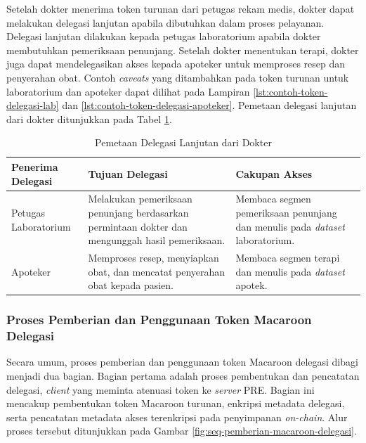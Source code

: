 \documentclass[bahasa, 12pt, a4paper, onecolumn, oneside, final]{report}
\begin{document}
Setelah dokter menerima token turunan dari petugas rekam medis, dokter dapat melakukan delegasi lanjutan apabila dibutuhkan dalam proses pelayanan. Delegasi lanjutan dilakukan kepada petugas laboratorium apabila dokter membutuhkan pemeriksaan penunjang. Setelah dokter menentukan terapi, dokter juga dapat mendelegasikan akses kepada apoteker untuk memproses resep dan penyerahan obat.  Contoh \textit{caveats} yang ditambahkan pada token turunan untuk laboratorium dan apoteker dapat dilihat pada Lampiran \ref{lst:contoh-token-delegasi-lab} dan \ref{lst:contoh-token-delegasi-apoteker}. Pemetaan delegasi lanjutan dari dokter ditunjukkan pada Tabel \ref{tab:pemetaan-delegasi-dokter-lanjutan}.

\begin{table}[!ht]
	\centering
	\caption{Pemetaan Delegasi Lanjutan dari Dokter}
	\label{tab:pemetaan-delegasi-dokter-lanjutan}
	\small
	\begin{tabular}{|p{}|p{}|p{}|}
		\hline
		\textbf{Penerima Delegasi} & \textbf{Tujuan Delegasi}                                                                        & \textbf{Cakupan Akses} \\ \hline

		Petugas Laboratorium
		                           & Melakukan pemeriksaan penunjang berdasarkan permintaan dokter dan mengunggah hasil pemeriksaan.
		                           & Membaca segmen pemeriksaan penunjang dan menulis pada \textit{dataset} laboratorium.                                     \\ \hline

		Apoteker
		                           & Memproses resep, menyiapkan obat, dan mencatat penyerahan obat kepada pasien.
		                           & Membaca segmen terapi dan menulis pada \textit{dataset} apotek.                                                          \\ \hline
	\end{tabular}
\end{table}

\subsubsection{Proses Pemberian dan Penggunaan Token Macaroon Delegasi}
\label{subsubsec:proses-pemberian-dan-penggunaan-macaroon-delegasi}

Secara umum, proses pemberian dan penggunaan token Macaroon delegasi dibagi menjadi dua bagian. Bagian pertama adalah proses pembentukan dan pencatatan delegasi, \textit{client} yang meminta atenuasi token ke \textit{server} PRE. Bagian ini mencakup pembentukan token Macaroon turunan, enkripsi metadata delegasi, serta pencatatan metadata akses terenkripsi pada penyimpanan \textit{on-chain}. Alur proses tersebut ditunjukkan pada Gambar \ref{fig:seq-pemberian-macaroon-delegasi}.
\end{document}
